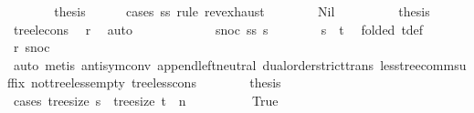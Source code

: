 \begin{isabellebody}
\ \ \ \ \isamarkupfalse%
\ \isamarkupfalse%
\ {\isacharquery}{\kern0pt}thesis\isanewline
\ \ \ \ \isamarkupfalse%
\ {\isacharparenleft}{\kern0pt}cases\ ss\ rule{\isacharcolon}{\kern0pt}\ rev{\isacharunderscore}{\kern0pt}exhaust{\isacharparenright}{\kern0pt}\isanewline
\ \ \ \ \ \ \isamarkupfalse%
\ Nil\isanewline
\ \ \ \ \ \ \isamarkupfalse%
\ \isamarkupfalse%
\ {\isacharquery}{\kern0pt}thesis\ \isamarkupfalse%
\ tree{\isacharunderscore}{\kern0pt}le{\isacharunderscore}{\kern0pt}cons\ \isamarkupfalse%
\ r\ \isamarkupfalse%
\ auto\isanewline
\ \ \ \ \isamarkupfalse%
\isanewline
\ \ \ \ \ \ \isamarkupfalse%
\ {\isacharparenleft}{\kern0pt}snoc\ ss{\isacharprime}{\kern0pt}\ s{\isacharprime}{\kern0pt}{\isacharparenright}{\kern0pt}\isanewline
\ \ \ \ \ \ \isamarkupfalse%
\ {\isachardoublequoteopen}s{\isacharprime}{\kern0pt}\ {\isacharless}{\kern0pt}\ t{\isachardoublequoteclose}\ \isamarkupfalse%
\ {}{\isacharparenleft}{\kern0pt}{}{\isacharparenright}{\kern0pt}{\isacharbrackleft}{\kern0pt}folded\ t{\isacharunderscore}{\kern0pt}def{\isacharbrackright}{\kern0pt}\ \isamarkupfalse%
\ r\ snoc\isanewline
\ \ \ \ \ \ \ \ \isamarkupfalse%
\ {\isacharparenleft}{\kern0pt}auto{\isacharcomma}{\kern0pt}\ metis\ antisym{\isacharunderscore}{\kern0pt}conv{}\ append{\isachardot}{\kern0pt}left{\isacharunderscore}{\kern0pt}neutral\ dual{\isacharunderscore}{\kern0pt}order{\isachardot}{\kern0pt}strict{\isacharunderscore}{\kern0pt}trans\ less{\isacharunderscore}{\kern0pt}tree{\isacharunderscore}{\kern0pt}comm{\isacharunderscore}{\kern0pt}suffix\ not{\isacharunderscore}{\kern0pt}tree{\isacharunderscore}{\kern0pt}less{\isacharunderscore}{\kern0pt}empty\ tree{\isacharunderscore}{\kern0pt}less{\isacharunderscore}{\kern0pt}cons{}{\isacharparenright}{\kern0pt}\isanewline
\ \ \ \ \ \ \isamarkupfalse%
\ {\isacharquery}{\kern0pt}thesis\isanewline
\ \ \ \ \ \ \isamarkupfalse%
\ {\isacharparenleft}{\kern0pt}cases\ {\isachardoublequoteopen}tree{\isacharunderscore}{\kern0pt}size\ s{\isacharprime}{\kern0pt}\ {\isacharequal}{\kern0pt}\ tree{\isacharunderscore}{\kern0pt}size\ t\ {\isacharplus}{\kern0pt}\ n{\isachardoublequoteclose}{\isacharparenright}{\kern0pt}\isanewline
\ \ \ \ \ \ \ \ \isamarkupfalse%
\ True\isanewline
\ \ \ \ \ \ \ \ \isamarkupfalse%

\end{isabellebody}
